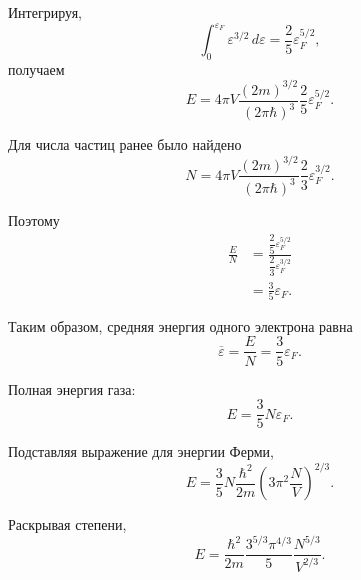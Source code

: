 \documentclass[../final.tex]{subfiles}
\begin{document}
Интегрируя,
%
\begin{equation*}
    \int_0^{\varepsilon_F}
    \varepsilon^{3/2}\,d\varepsilon
    =
    \frac{2}{5}
    \varepsilon_F^{5/2},
\end{equation*}
%
получаем
%
\begin{equation*}
    E
    =
    4\pi V
    \frac{
        (2m)^{3/2}
    }{
        (2\pi\hbar)^3
    }
    \frac{2}{5}
    \varepsilon_F^{5/2}.
\end{equation*}

Для числа частиц ранее было найдено
%
\begin{equation*}
    N
    =
    4\pi V
    \frac{
        (2m)^{3/2}
    }{
        (2\pi\hbar)^3
    }
    \frac{2}{3}
    \varepsilon_F^{3/2}.
\end{equation*}

Поэтому
%
\begin{align*}
    \frac{E}{N}
    &=
    \frac{
        \dfrac{2}{5}
        \varepsilon_F^{5/2}
    }{
        \dfrac{2}{3}
        \varepsilon_F^{3/2}
    }
    \\[5pt]
    &=
    \frac{3}{5}
    \varepsilon_F.
\end{align*}

Таким образом, средняя энергия одного электрона равна
%
\begin{equation*}
    \boxed{
        \overline{\varepsilon}
        =
        \frac{E}{N}
        =
        \frac{3}{5}
        \varepsilon_F
    }.
\end{equation*}

Полная энергия газа:
%
\begin{equation*}
    \boxed{
        E
        =
        \frac{3}{5}
        N\varepsilon_F
    }.
\end{equation*}

Подставляя выражение для энергии Ферми,
%
\begin{equation*}
    E
    =
    \frac{3}{5}
    N
    \frac{
        \hbar^2
    }{
        2m
    }
    \left(
        3\pi^2
        \frac{N}{V}
    \right)^{2/3}.
\end{equation*}

Раскрывая степени,
%
\begin{equation*}
    \boxed{
        E
        =
        \frac{
            \hbar^2
        }{
            2m
        }
        \frac{
            3^{5/3}\pi^{4/3}
        }{
            5
        }
        \frac{
            N^{5/3}
        }{
            V^{2/3}
        }
    }.
\end{equation*}
\end{document}
